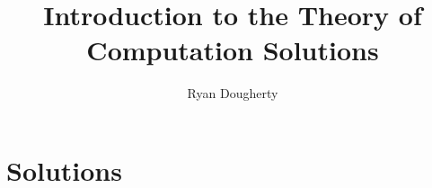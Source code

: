 \documentclass[10pt]{book}
\title{Introduction to the Theory of Computation Solutions}
\author{Ryan Dougherty}
\date{}
\begin{document}
\maketitle

\tableofcontents

\chapter{Solutions}










\end{document}
